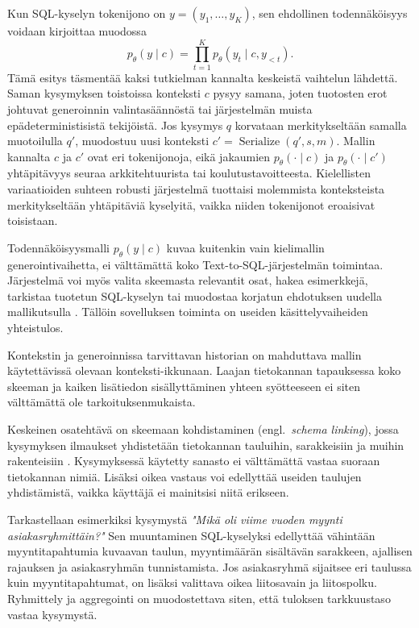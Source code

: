Kun SQL-kyselyn tokenijono on \(y=(y_1,\dots,y_K)\),
sen ehdollinen todennäköisyys voidaan kirjoittaa muodossa
$$
p_{\theta}(y \mid c)
=
\prod_{t=1}^{K}
p_{\theta}(y_t \mid c,y_{<t}).
$$
Tämä esitys täsmentää kaksi tutkielman kannalta keskeistä
vaihtelun lähdettä. Saman kysymyksen toistoissa konteksti \(c\)
pysyy samana, joten tuotosten erot johtuvat generoinnin
valintasäännöstä tai järjestelmän muista epädeterministisistä
tekijöistä. Jos kysymys \(q\) korvataan merkitykseltään
samalla muotoilulla \(q'\), muodostuu uusi konteksti
\(c'=\operatorname{Serialize}(q',s,m)\). Mallin kannalta
\(c\) ja \(c'\) ovat eri tokenijonoja, eikä jakaumien
\(p_{\theta}(\cdot \mid c)\) ja \(p_{\theta}(\cdot \mid c')\)
yhtäpitävyys seuraa arkkitehtuurista tai koulutustavoitteesta.
Kielellisten variaatioiden suhteen robusti järjestelmä tuottaisi
molemmista konteksteista merkitykseltään yhtäpitäviä kyselyitä,
vaikka niiden tokenijonot eroaisivat toisistaan.

Todennäköisyysmalli \(p_{\theta}(y \mid c)\) kuvaa kuitenkin vain kielimallin generointivaihetta, ei välttämättä koko Text-to-SQL-järjestelmän toimintaa. Järjestelmä voi myös valita skeemasta relevantit osat, hakea esimerkkejä, tarkistaa tuotetun SQL-kyselyn tai muodostaa korjatun ehdotuksen uudella mallikutsulla \cite{hong2024survey}. Tällöin sovelluksen toiminta on useiden käsittelyvaiheiden yhteistulos.

Kontekstin ja generoinnissa tarvittavan historian on
mahduttava mallin käytettävissä olevaan konteksti-ikkunaan.
Laajan tietokannan tapauksessa koko skeeman ja kaiken
lisätiedon sisällyttäminen yhteen syötteeseen ei siten
välttämättä ole tarkoituksenmukaista.

Keskeinen osatehtävä on skeemaan kohdistaminen
(engl.\ \emph{schema linking}), jossa kysymyksen ilmaukset
yhdistetään tietokannan tauluihin, sarakkeisiin ja muihin
rakenteisiin \cite{wang2020rat}. Kysymyksessä käytetty sanasto ei välttämättä
vastaa suoraan tietokannan nimiä. Lisäksi oikea vastaus
voi edellyttää useiden taulujen yhdistämistä, vaikka
käyttäjä ei mainitsisi niitä erikseen.

Tarkastellaan esimerkiksi kysymystä \emph{"Mikä oli viime vuoden myynti asiakasryhmittäin?"}
Sen muuntaminen SQL-kyselyksi edellyttää vähintään
myyntitapahtumia kuvaavan taulun, myyntimäärän
sisältävän sarakkeen, ajallisen rajauksen ja
asiakasryhmän tunnistamista. Jos asiakasryhmä sijaitsee
eri taulussa kuin myyntitapahtumat, on lisäksi
valittava oikea liitosavain ja liitospolku.
Ryhmittely ja aggregointi on muodostettava siten,
että tuloksen tarkkuustaso vastaa kysymystä.

